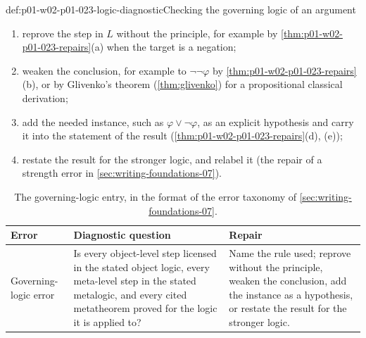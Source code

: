 \begin{hbmethod}{def:p01-w02-p01-023-logic-diagnostic}{Checking the governing logic of an argument}
\begin{enumerate}
        \begin{enumerate}
          \item[R1] reprove the step in \(L\) without the principle, for
                example by \cref{thm:p01-w02-p01-023-repairs}(a) when the
                target is a negation;
          \item[R2] weaken the conclusion, for example to \(\neg\neg\varphi\)
                by \cref{thm:p01-w02-p01-023-repairs}(b), or by Glivenko's
                theorem (\cref{thm:glivenko}) for a propositional classical
                derivation;
          \item[R3] add the needed instance, such as
                \(\varphi\lor\neg\varphi\), as an explicit hypothesis and
                carry it into the statement of the result
                (\cref{thm:p01-w02-p01-023-repairs}(d), (e));
          \item[R4] restate the result for the stronger logic, and relabel it
                (the repair of a strength error in
                \cref{sec:writing-foundations-07}).
        \end{enumerate}
\end{enumerate}
\end{hbmethod}

\begin{table}[tp]
\centering
\small
\begin{tabular}{@{}p{}p{}p{}@{}}
\toprule
Error & Diagnostic question & Repair \\
\midrule
Governing-logic error & Is every object-level step licensed in the stated
object logic, every meta-level step in the stated metalogic, and every cited
metatheorem proved for the logic it is applied to? & Name the rule used;
reprove without the principle, weaken the conclusion, add the instance as a
hypothesis, or restate the result for the stronger logic. \\
\bottomrule
\end{tabular}
\caption{The governing-logic entry, in the format of the error taxonomy of
\cref{sec:writing-foundations-07}.}
\label{tab:p01-w02-p01-023-logic-error}
\end{table}

